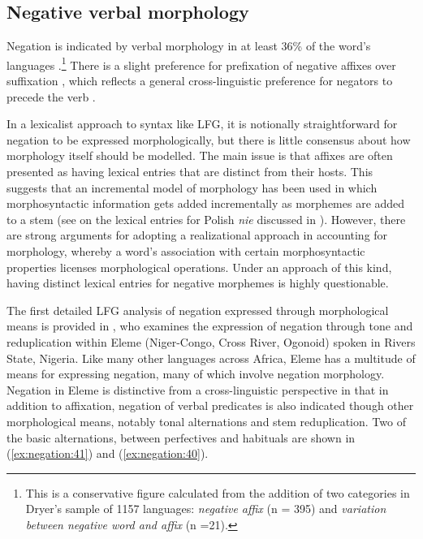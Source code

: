 \documentclass[output=paper,hidelinks]{langscibook}
\begin{document}
\subsection{Negative verbal morphology}
\label{sec:negation:morphology}
Negation is indicated by verbal morphology in at least 36\% of the word's languages \citep {Dryer13b}.\footnote{This is a conservative figure calculated from the addition of two categories in Dryer's sample of 1157 languages: \emph{negative affix} (n = 395) and \emph{variation between negative word and affix} (n =21).} There is a slight preference for prefixation of negative affixes over suffixation \citep {Dryer13b}, which reflects a general cross-linguistic preference for negators to precede the verb \citep{Dryer:89}.

In a lexicalist approach to syntax like LFG, it is notionally straightforward for negation to be expressed morphologically, but there is little consensus about how morphology itself should be modelled. The main issue is that affixes are often presented as having lexical entries that are distinct from their hosts. This suggests that an incremental model of morphology has been used  in which morphosyntactic information gets added incrementally as morphemes are added to a stem (see \citet [158]{camilleri-sadler:2017} on the lexical entries for Polish \emph{nie} discussed in ). However, there are strong arguments for adopting a realizational approach in accounting for morphology, whereby a word's association with certain morphosyntactic properties licenses morphological operations. Under an approach of this kind, having distinct lexical entries for negative morphemes is highly questionable. 

The first detailed LFG analysis of negation expressed through morphological means is provided in \citet {Bond2016}, who examines the expression of negation through tone and reduplication within Eleme (Niger-Congo, Cross River, Ogonoid) spoken in Rivers State, Nigeria. Like many other languages across Africa, Eleme has a multitude of means for expressing negation, many of which involve negation morphology. Negation in Eleme is distinctive from a cross-linguistic perspective in that in addition to affixation, negation of verbal predicates is also indicated though other morphological means, notably tonal alternations and stem reduplication. Two of the basic alternations, between perfectives and habituals are shown in (\ref{ex:negation:41}) and (\ref{ex:negation:40}).
\end{document}
